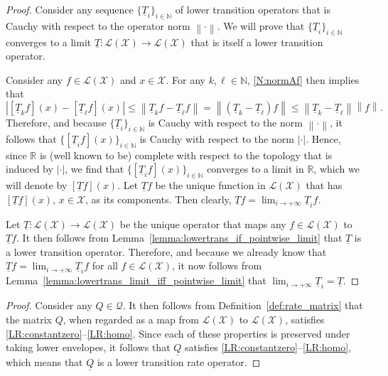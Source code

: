 \documentclass[10pt,a4paper]{paper}
\theoremstyle{definition}
\newcommand{\nats}{\mathbb{N}}
\newcommand{\reals}{\mathbb{R}}
\newcommand{\states}{\mathcal{X}}
\newcommand{\lt}{\underline{T}}
\newcommand{\gambles}{\mathcal{L}}
\newcommand{\gamblesX}{\gambles(\states)}
\newcommand{\rateset}{\mathcal{Q}}
\newcommand{\lrate}{\underline{Q}}
\newcommand{\norm}[1]{\left\lVert #1 \right\rVert}
\newcommand{\abs}[1]{\left\vert #1 \right\vert}
\begin{document}
\lemmacompletemetricspace*
\begin{proof}
Consider any sequence $\{\lt_i\}_{i\in\nats}$ of lower transition operators that is Cauchy with respect to the operator norm $\norm{\cdot}$. We will prove that $\{\lt_i\}_{i\in\nats}$ converges to a limit $\lt\colon\gamblesX\to\gamblesX$ that is itself a lower transition operator.

Consider any $f\in\gamblesX$ and $x\in\states$. For any $k,\ell\in\nats$, \eqref{N:normAf} then implies that
\begin{equation*}
\abs{[\lt_k f](x)-[\lt_\ell f](x)}
\leq\norm{\lt_k f-\lt_\ell f}
=\norm{(\lt_k-\lt_\ell)f}
\leq\norm{\lt_k-\lt_\ell}\norm{f}.
\end{equation*}
Therefore, and because $\{\lt_i\}_{i\in\nats}$ is Cauchy with respect to the norm $\norm{\cdot}$, it follows that $\{[\lt_i f](x)\}_{i\in\nats}$ is Cauchy with respect to the norm $\abs{\cdot}$. Hence, since $\reals$ is (well known to be) complete with respect to the topology that is induced by $\abs{\cdot}$, we find that $\{[\lt_i f](x)\}_{i\in\nats}$ converges to a limit in $\reals$, which we will denote by $[\lt f](x)$. Let $\lt f$ be the unique function in $\gamblesX$ that has $[\lt f](x)$, $x\in\states$, as its components. Then clearly, $\lt f=\lim_{i\to+\infty}\lt_if$. 

Let $\lt\colon\gamblesX\to\gamblesX$ be the unique operator that maps any $f\in\gamblesX$ to $\lt f$. It then follows from Lemma~\ref{lemma:lowertrans_if_pointwise_limit} that $\lt$ is a lower transition operator. Therefore, and because we already know that $\lt f=\lim_{i\to+\infty}\lt_i f$ for all $f\in\gamblesX$, it now follows from Lemma~\ref{lemma:lowertrans_limit_iff_pointwise_limit} that $\lim_{i\to+\infty}\lt_i=\lt$.
\end{proof}

\proplowerenvelopeislowertrans*
\begin{proof}
Consider any $Q\in\rateset$. It then follows from Definition~\ref{def:rate_matrix} that the matrix $Q$, when regarded as a map from $\gamblesX$ to $\gamblesX$, satisfies \ref{LR:constantzero}--\ref{LR:homo}. Since each of these properties is preserved under taking lower envelopes, it follows that $\lrate$ satisfies \ref{LR:constantzero}--\ref{LR:homo}, which means that $\lrate$ is a lower transition rate operator.
\end{proof}
\end{document}
